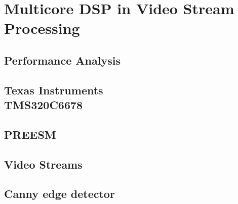 \chapter{Multicore DSP in Video Stream Processing}
\label{chapter:experiments}


\section{Performance Analysis}
\label{sec:performance-analysis}


\section[Texas Instruments TMS320C6678]{Texas Instruments\\TMS320C6678}
\label{sec:c6678}


\section{PREESM}
\label{sec:preesm}


\section{Video Streams}
\label{sec:video-streams}


\section{Canny edge detector}
\label{sec:canny}



